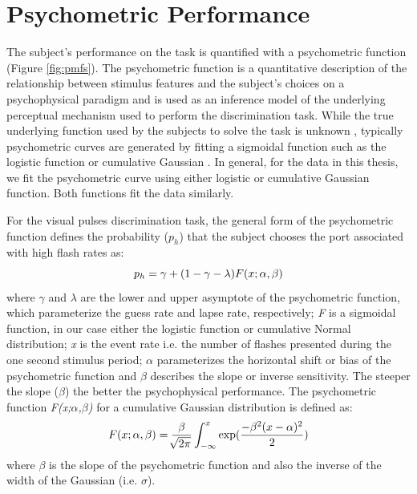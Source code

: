 \section{Psychometric Performance}
The subject's performance on the task is quantified with a psychometric function (Figure \ref{fig:pmfs}). The psychometric function is a quantitative description of the relationship between stimulus features and the subject's choices on a psychophysical paradigm and is used as an inference model of the underlying perceptual mechanism used to perform the discrimination task. While the true underlying function used by the subjects to solve the task is unknown \parencite{Kingdom2010}, typically psychometric curves are generated by fitting a sigmoidal function such as the logistic function or cumulative Gaussian \parencite{Wichmann2001}. In general, for the data in this thesis, we fit the psychometric curve using either logistic or cumulative Gaussian function. Both functions fit the data similarly.\par 
For the visual pulses discrimination task, the general form of the psychometric function defines the probability (\emph{$p_h$}) that the subject chooses the port associated with high flash rates as:
\begin{equation}
	\centering
	p_h = \gamma + (1-\gamma - \lambda)F(x;\alpha,\beta)
\end{equation}
where $\gamma$ and $\lambda$ are the lower and upper asymptote of the psychometric function, which parameterize the guess rate and lapse rate, respectively; \emph{F} is a sigmoidal function, in our case either the logistic function or cumulative Normal distribution; \emph{x} is the event rate i.e. the number of flashes presented during the one second stimulus period; $\alpha$ parameterizes the horizontal shift or bias of the psychometric function and $\beta$ describes the slope or inverse sensitivity. The steeper the slope ($\beta$) the better the psychophysical performance. The psychometric function \emph{F(x;$\alpha$,$\beta$)} for a cumulative Gaussian distribution is defined as: 
\begin{equation}
	\centering
	F(x;\alpha,\beta) = \frac{\beta}{\sqrt[]{2\pi}} \int_{-\infty}^{x} \exp(\frac{-\beta^{2}(x-\alpha)^{2}}{2})
   \label{eq:normalpmf}
\end{equation}
where $\beta$ is the slope of the psychometric function and also the inverse of the width of the Gaussian (i.e. $\sigma$). 
